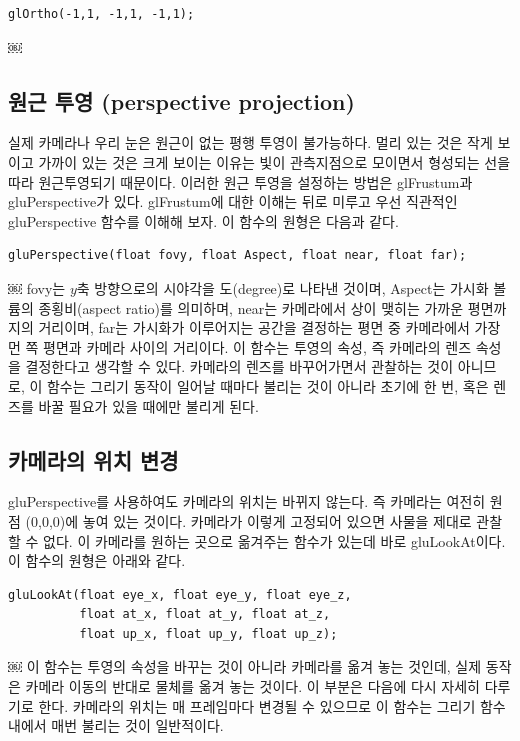 \begin{verbatim}
glOrtho(-1,1, -1,1, -1,1);
\end{verbatim}

￼
\subsection{원근 투영 (perspective projection)}

실제 카메라나 우리 눈은 원근이 없는 평행 투영이 불가능하다. 멀리 있는 것은 작게 보이고 가까이 있는 것은 크게 보이는 이유는 빛이 관측지점으로 모이면서 형성되는 선을 따라 원근투영되기 때문이다. 이러한 원근 투영을 설정하는 방법은 {\sf glFrustum}과 
{\sf gluPerspective}가 있다. {\sf glFrustum}에 대한 이해는 뒤로 미루고 우선 직관적인
{\sf  gluPerspective} 함수를 이해해 보자. 이 함수의 원형은 다음과 같다.

\begin{verbatim}
gluPerspective(float fovy, float Aspect, float near, float far);
\end{verbatim}

￼
{\sf fovy}는 $y$축 방향으로의 시야각을 도(degree)로 나타낸 것이며, {\sf Aspect}는 가시화 볼륨의 종횡비(aspect ratio)를 의미하며, 
{\sf near}는 카메라에서 상이 맺히는 가까운 평면까지의 거리이며, {\sf far}는 가시화가 이루어지는 공간을 결정하는 평면 중 카메라에서 가장 먼 쪽 평면과 카메라 사이의 거리이다.
이 함수는 투영의 속성, 즉 카메라의 렌즈 속성을 결정한다고 생각할 수 있다. 카메라의 렌즈를 바꾸어가면서 관찰하는 것이 아니므로, 이 함수는 그리기 동작이 일어날 때마다 불리는 것이 아니라 초기에 한 번, 혹은 렌즈를 바꿀 필요가 있을 때에만 불리게 된다. 

\subsection{카메라의 위치 변경}

{\sf gluPerspective}를 사용하여도 카메라의 위치는 바뀌지 않는다. 즉 카메라는 여전히 원점 (0,0,0)에 놓여 있는 것이다. 
카메라가 이렇게 고정되어 있으면 사물을 제대로 관찰할 수 없다. 
이 카메라를 원하는 곳으로 옮겨주는 함수가 있는데 바로 {\sf gluLookAt}이다. 이 함수의 원형은 아래와 같다.

\begin{verbatim}
gluLookAt(float eye_x, float eye_y, float eye_z,
          float at_x, float at_y, float at_z,
          float up_x, float up_y, float up_z);
\end{verbatim}

￼
이 함수는 투영의 속성을 바꾸는 것이 아니라 카메라를 옮겨 놓는 것인데, 실제 동작은 카메라 이동의 반대로 물체를 옮겨 놓는 것이다. 이 부분은 다음에 다시 자세히 다루기로 한다. 카메라의 위치는 매 프레임마다 변경될 수 있으므로 이 함수는 그리기 함수 내에서 매번 불리는 것이 일반적이다.


